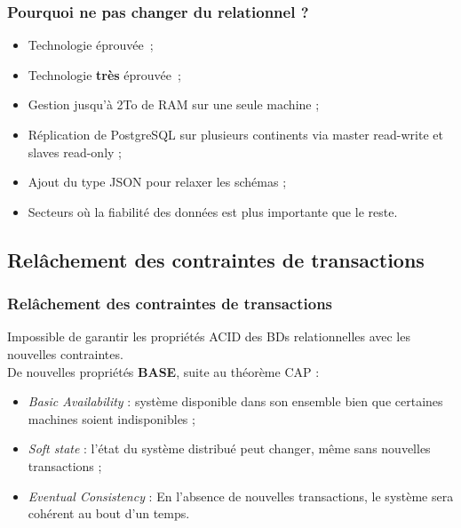     \begin{frame}
        \frametitle{Pourquoi ne pas changer du relationnel ?}

        \begin{itemize}
            \item Technologie éprouvée ;
            \item Technologie \textbf{très} éprouvée ;
        \end{itemize}

        \begin{itemize}
            \item Gestion jusqu'à 2To de RAM sur une seule machine ;
            \item Réplication de PostgreSQL sur plusieurs continents via master read-write et slaves read-only ;
            \item Ajout du type JSON pour relaxer les schémas ;
            \item Secteurs où la fiabilité des données est plus importante que le reste.
        \end{itemize}
    \end{frame}

    \subsection{Relâchement des contraintes de transactions}
    \begin{frame}
        \frametitle{Relâchement des contraintes de transactions}

        Impossible de garantir les propriétés ACID des BDs relationnelles avec les nouvelles contraintes.\\
        \vspace{10px}
        De nouvelles propriétés \textbf{BASE}, suite au théorème CAP :
        \begin{itemize}
            \item \textit{Basic Availability} : système disponible dans son ensemble bien que certaines machines soient indisponibles ;
            \item \textit{Soft state} : l'état du système distribué peut changer, même sans nouvelles transactions ;
            \item \textit{Eventual Consistency} : En l'absence de nouvelles transactions, le système sera cohérent au bout d'un temps.
        \end{itemize}
    \end{frame}

